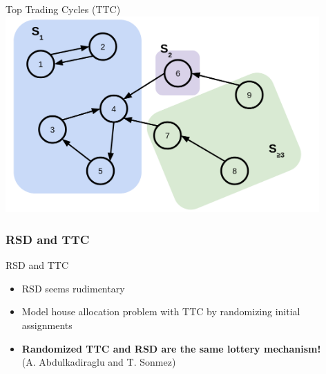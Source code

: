 \begin{frame}{Top Trading Cycles (TTC)}
    \centering
    \includegraphics[width=12cm]{img/ttc/ttcstages.png}
\end{frame}

\subsubsection{RSD and TTC}
\begin{frame}{RSD and TTC}
    \begin{itemize}[<+->]
        \item RSD seems rudimentary
        \item Model house allocation problem with TTC by randomizing initial assignments
        \item \textbf{Randomized TTC and RSD are the same lottery mechanism!} \\
        (A. Abdulkadiraglu and T. Sonmez)
    \end{itemize}
\end{frame}